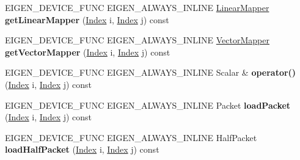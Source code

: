 \begin{DoxyCompactItemize}
E\+I\+G\+E\+N\+\_\+\+D\+E\+V\+I\+C\+E\+\_\+\+F\+U\+NC E\+I\+G\+E\+N\+\_\+\+A\+L\+W\+A\+Y\+S\+\_\+\+I\+N\+L\+I\+NE \hyperlink{class_eigen_1_1internal_1_1_blas_linear_mapper}{Linear\+Mapper} {\bfseries get\+Linear\+Mapper} (\hyperlink{namespace_eigen_a62e77e0933482dafde8fe197d9a2cfde}{Index} i, \hyperlink{namespace_eigen_a62e77e0933482dafde8fe197d9a2cfde}{Index} j) const
\item 
\mbox{\label{class_eigen_1_1internal_1_1blas__data__mapper_acd275391ce4e8698f1c4001bdc7f17e6}} 
E\+I\+G\+E\+N\+\_\+\+D\+E\+V\+I\+C\+E\+\_\+\+F\+U\+NC E\+I\+G\+E\+N\+\_\+\+A\+L\+W\+A\+Y\+S\+\_\+\+I\+N\+L\+I\+NE \hyperlink{class_eigen_1_1internal_1_1_blas_vector_mapper}{Vector\+Mapper} {\bfseries get\+Vector\+Mapper} (\hyperlink{namespace_eigen_a62e77e0933482dafde8fe197d9a2cfde}{Index} i, \hyperlink{namespace_eigen_a62e77e0933482dafde8fe197d9a2cfde}{Index} j) const
\item 
\mbox{\label{class_eigen_1_1internal_1_1blas__data__mapper_acfc17ca5e17082a5ec461875239dfdbc}} 
E\+I\+G\+E\+N\+\_\+\+D\+E\+V\+I\+C\+E\+\_\+\+F\+U\+NC E\+I\+G\+E\+N\+\_\+\+A\+L\+W\+A\+Y\+S\+\_\+\+I\+N\+L\+I\+NE Scalar \& {\bfseries operator()} (\hyperlink{namespace_eigen_a62e77e0933482dafde8fe197d9a2cfde}{Index} i, \hyperlink{namespace_eigen_a62e77e0933482dafde8fe197d9a2cfde}{Index} j) const
\item 
\mbox{\label{class_eigen_1_1internal_1_1blas__data__mapper_ad82c65c2daa3e60f0ab6d96eab37b4f8}} 
E\+I\+G\+E\+N\+\_\+\+D\+E\+V\+I\+C\+E\+\_\+\+F\+U\+NC E\+I\+G\+E\+N\+\_\+\+A\+L\+W\+A\+Y\+S\+\_\+\+I\+N\+L\+I\+NE Packet {\bfseries load\+Packet} (\hyperlink{namespace_eigen_a62e77e0933482dafde8fe197d9a2cfde}{Index} i, \hyperlink{namespace_eigen_a62e77e0933482dafde8fe197d9a2cfde}{Index} j) const
\item 
\mbox{\label{class_eigen_1_1internal_1_1blas__data__mapper_ab20e83fe585195cf86f2f4f46409a186}} 
E\+I\+G\+E\+N\+\_\+\+D\+E\+V\+I\+C\+E\+\_\+\+F\+U\+NC E\+I\+G\+E\+N\+\_\+\+A\+L\+W\+A\+Y\+S\+\_\+\+I\+N\+L\+I\+NE Half\+Packet {\bfseries load\+Half\+Packet} (\hyperlink{namespace_eigen_a62e77e0933482dafde8fe197d9a2cfde}{Index} i, \hyperlink{namespace_eigen_a62e77e0933482dafde8fe197d9a2cfde}{Index} j) const
\item 

\end{DoxyCompactItemize}
